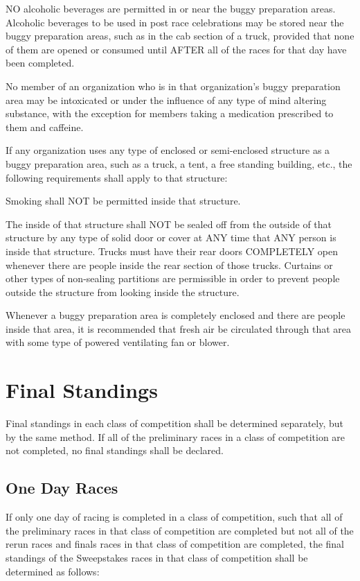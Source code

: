 	NO alcoholic beverages are permitted in or near the buggy preparation areas. Alcoholic beverages to be used in post race celebrations may be stored near the buggy preparation areas, such as in the cab section of a truck, provided that none of them are opened or consumed until AFTER all of the races for that day have been completed.

	No member of an organization who is in that organization's buggy preparation area may be intoxicated or under the influence of any type of mind altering substance, with the exception for members taking a medication prescribed to them and caffeine. 

	If any organization uses any type of enclosed or semi-enclosed structure as a buggy preparation area, such as a truck, a tent, a free standing building, etc., the following requirements shall apply to that structure:

	Smoking shall NOT be permitted inside that structure.

	The inside of that structure shall NOT be sealed off from the outside of that structure by any type of solid door or cover at ANY time that ANY person is inside that structure. Trucks must have their rear doors COMPLETELY open whenever there are people inside the rear section of those trucks. Curtains or other types of non-sealing partitions are permissible in order to prevent people outside the structure from looking inside the structure.

	Whenever a buggy preparation area is completely enclosed and there are people inside that area, it is recommended that fresh air be circulated through that area with some type of powered ventilating fan or blower.

\section{Final Standings}

	Final standings in each class of competition shall be determined separately, but by the same method. If all of the preliminary races in a class of competition are not completed, no final standings shall be declared.

\subsection{One Day Races}

	If only one day of racing is completed in a class of competition, such that all of the preliminary races in that class of competition are completed but not all of the rerun races and finals races in that class of competition are completed, the final standings of the Sweepstakes races in that class of competition shall be determined as follows:
	\newline

